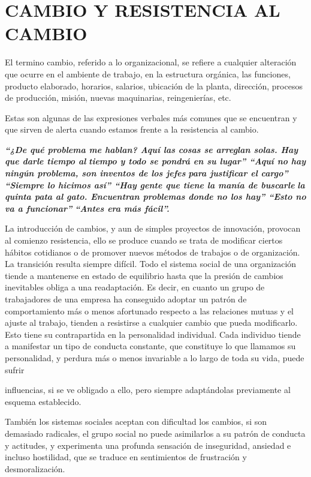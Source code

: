\section*{CAMBIO Y RESISTENCIA AL CAMBIO}
El termino cambio, referido a lo organizacional, se refiere a cualquier alteración que ocurre en el ambiente de trabajo, en la estructura orgánica, las funciones, producto elaborado, horarios, salarios, ubicación de la planta, dirección, procesos de producción, misión, nuevas maquinarias, reingenierías, etc.

Estas son algunas de las expresiones verbales más comunes que se encuentran y que sirven de alerta cuando estamos frente a la resistencia al cambio.

\textbf{\textit{“¿De qué problema me hablan? Aquí las cosas se arreglan solas. Hay que darle tiempo al}} \textbf{\textit{tiempo y todo se pondrá en su lugar” “Aquí no hay ningún problema, son inventos de los jefes}} \textbf{\textit{para justificar el cargo” “Siempre lo hicimos así” “Hay gente que tiene la manía de buscarle}} \textbf{\textit{la quinta pata al gato. Encuentran problemas donde no los hay” “Esto no va a funcionar”}} \textbf{\textit{“Antes era más fácil”.}}

La introducción de cambios, y aun de simples proyectos de innovación, provocan al comienzo resistencia, ello se produce cuando se trata de modificar ciertos hábitos cotidianos o de promover nuevos métodos de trabajos o de organización. La transición resulta siempre difícil. Todo el sistema social de una organización tiende a mantenerse en estado de equilibrio hasta que la presión de cambios inevitables obliga a una readaptación. Es decir, en cuanto un grupo de trabajadores de una empresa ha conseguido adoptar un patrón de comportamiento más o menos afortunado respecto a las relaciones mutuas y el ajuste al trabajo, tienden a resistirse a cualquier cambio que pueda modificarlo. Esto tiene su contrapartida en la personalidad individual. Cada individuo tiende a manifestar un tipo de conducta constante, que constituye lo que llamamos su personalidad, y perdura más o menos invariable a lo largo de toda su vida, puede sufrir



influencias, si se ve obligado a ello, pero siempre adaptándolas previamente al esquema establecido.

También los sistemas sociales aceptan con dificultad los cambios, si son demasiado radicales, el grupo social no puede asimilarlos a su patrón de conducta y actitudes, y experimenta una profunda sensación de inseguridad, ansiedad e incluso hostilidad, que se traduce en sentimientos de frustración y desmoralización.

